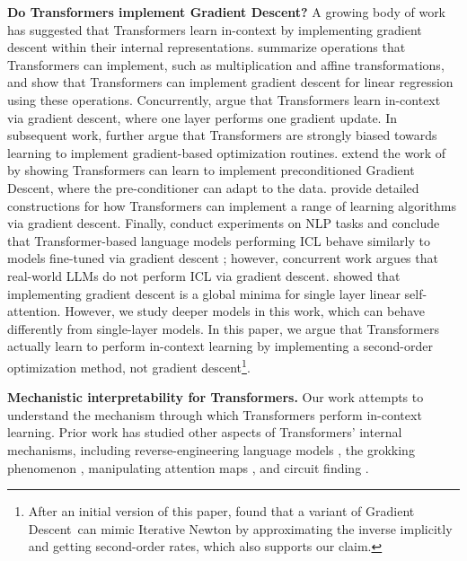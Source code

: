 \documentclass[11pt]{article}
\theoremstyle{plain}
\theoremstyle{definition}
\theoremstyle{remark}
\renewcommand{\^}[1]{^{(#1)}}
\newcommand{\gd}{Gradient Descent}
\newcommand{\new}[1]{{\color{black} {#1}}}
\renewcommand{\paragraph}[1]{\vspace{1mm}\noindent\textbf{#1}}
\begin{document}
\paragraph{Do Transformers implement Gradient Descent? }
A growing body of work has suggested that Transformers learn in-context by implementing gradient descent within their internal representations.
\citet{Akyrek2022WhatLA} summarize operations that Transformers can implement, such as multiplication and affine transformations, and show that Transformers can implement gradient descent for linear regression using these operations.
Concurrently, \citet{Oswald2022TransformersLI} argue that Transformers learn in-context via gradient descent, where one layer performs one gradient update.
In subsequent work, \citet{Oswald2023UncoveringMA} further argue that Transformers are strongly biased towards learning to implement gradient-based optimization routines.
\citet{Ahn2023TransformersLT} extend the work of \citet{Oswald2022TransformersLI} by showing Transformers can learn to implement preconditioned \gd, where the pre-conditioner can adapt to the data. 
\citet{Bai2023TransformersAS} provide detailed constructions for how Transformers can implement a range of learning algorithms via gradient descent.
Finally, \citet{Dai2023WhyCG} conduct experiments on NLP tasks and conclude that Transformer-based language models performing ICL behave similarly to models fine-tuned via gradient descent\new{; however, concurrent work \citep{shen2023pretrained} argues that real-world LLMs do not perform ICL via gradient descent}.
\citet{mahankali2024one} showed that implementing gradient descent is a global minima for single layer linear self-attention. However, we study deeper models in this work, which can behave differently from single-layer models.
In this paper, we argue that Transformers actually learn to perform in-context learning by implementing a second-order optimization method, not gradient descent\footnote{After an initial version of this paper, \citet{vladymyrov2024linear} found that a variant of \gd\ can mimic Iterative Newton by approximating the inverse implicitly and getting second-order rates, which also supports our claim.}.

\paragraph{Mechanistic interpretability for Transformers. }
Our work attempts to understand the mechanism through which Transformers perform in-context learning.
Prior work has studied other aspects of Transformers' internal mechanisms, including 
reverse-engineering language models \citep{wang2022interpretability}, the grokking phenomenon  \citep{power2022grokking,nanda2023progress}, manipulating attention maps
\citep{hassid2022does}, and circuit finding \citep{conmy2023automated}. 
\end{document}
